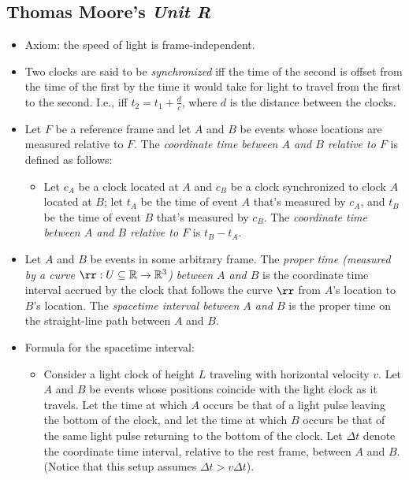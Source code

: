 \documentclass{article}
\begin{document}
\newpage

\subsection*{Thomas Moore's \textit{Unit R}}

\begin{itemize}
    \item Axiom: the speed of light is frame-independent.
    \item Two clocks are said to be \textit{synchronized} iff the time of the second is offset from the time of the first by the time it would take for light to travel from the first to the second. I.e., iff $t_2 = t_1 + \frac{d}{c}$, where $d$ is the distance between the clocks.
    \item Let $F$ be a reference frame and let $A$ and $B$ be events whose locations are measured relative to $F$. The \textit{coordinate time between $A$ and $B$ relative to $F$} is defined as follows:
    \begin{itemize}
        \item Let $c_A$ be a clock located at $A$ and $c_B$ be a clock synchronized to clock $A$ located at $B$; let $t_A$ be the time of event $A$ that's measured by $c_A$, and $t_B$ be the time of event $B$ that's measured by $c_B$. The \textit{coordinate time between $A$ and $B$ relative to $F$} is $t_B - t_A$.
    \end{itemize}
    \item Let $A$ and $B$ be events in some arbitrary frame. The \textit{proper time (measured by a curve $\rr:U \subseteq \R \rightarrow \R^3$) between $A$ and $B$} is the coordinate time interval accrued by the clock that follows the curve $\rr$ from $A$'s location to $B$'s location. The \textit{spacetime interval between $A$ and $B$} is the proper time on the straight-line path between $A$ and $B$.
    \item Formula for the spacetime interval:
    \begin{itemize}
        \item Consider a light clock of height $L$ traveling with horizontal velocity $v$. Let $A$ and $B$ be events whose positions coincide with the light clock as it travels. Let the time at which $A$ occurs be that of a light pulse leaving the bottom of the clock, and let the time at which $B$ occurs be that of the same light pulse returning to the bottom of the clock. Let $\Delta t$ denote the coordinate time interval, relative to the rest frame, between $A$ and $B$. (Notice that this setup assumes $\Delta t > v \Delta t$).

\end{itemize}
\end{itemize}
\end{document}
